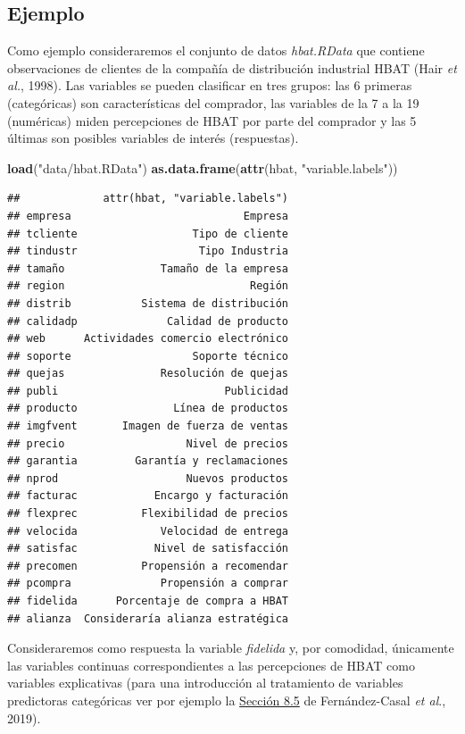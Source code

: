 \documentclass[
]{book}
\newenvironment{Shaded}{\begin{snugshade}}{\end{snugshade}}
\newcommand{\KeywordTok}[1]{\textcolor[rgb]{0.13,0.29,0.53}{\textbf{#1}}}
\newcommand{\NormalTok}[1]{#1}
\newcommand{\StringTok}[1]{\textcolor[rgb]{0.31,0.60,0.02}{#1}}
\theoremstyle{break}
\theoremstyle{definition}
\theoremstyle{definition}
\theoremstyle{definition}
\theoremstyle{remark}
\begin{document}
\hypertarget{ejemplo-1}{%
\subsection{Ejemplo}\label{ejemplo-1}}

Como ejemplo consideraremos el conjunto de datos \emph{hbat.RData} que contiene observaciones de clientes de la compañía de distribución industrial HBAT (Hair \emph{et al.}, 1998).
Las variables se pueden clasificar en tres grupos: las 6 primeras (categóricas) son características del comprador, las variables de la 7 a la 19 (numéricas) miden percepciones de HBAT por parte del comprador y las 5 últimas son posibles variables de interés (respuestas).

\begin{Shaded}
\begin{Highlighting}[]
\KeywordTok{load}\NormalTok{(}\StringTok{"data/hbat.RData"}\NormalTok{)}
\KeywordTok{as.data.frame}\NormalTok{(}\KeywordTok{attr}\NormalTok{(hbat, }\StringTok{"variable.labels"}\NormalTok{))}
\end{Highlighting}
\end{Shaded}

\begin{verbatim}
##             attr(hbat, "variable.labels")
## empresa                           Empresa
## tcliente                  Tipo de cliente
## tindustr                   Tipo Industria
## tamaño               Tamaño de la empresa
## region                             Región
## distrib           Sistema de distribución
## calidadp              Calidad de producto
## web      Actividades comercio electrónico
## soporte                   Soporte técnico
## quejas               Resolución de quejas
## publi                          Publicidad
## producto               Línea de productos
## imgfvent       Imagen de fuerza de ventas
## precio                   Nivel de precios
## garantia         Garantía y reclamaciones
## nprod                    Nuevos productos
## facturac            Encargo y facturación
## flexprec          Flexibilidad de precios
## velocida             Velocidad de entrega
## satisfac            Nivel de satisfacción
## precomen          Propensión a recomendar
## pcompra              Propensión a comprar
## fidelida      Porcentaje de compra a HBAT
## alianza  Consideraría alianza estratégica
\end{verbatim}

Consideraremos como respuesta la variable \emph{fidelida} y, por comodidad, únicamente las variables continuas correspondientes a las percepciones de HBAT como variables explicativas (para una introducción al tratamiento de variables predictoras categóricas ver por ejemplo la \href{https://rubenfcasal.github.io/intror/modelos-lineales.html\#regresion-con-variables-categoricas}{Sección 8.5} de Fernández-Casal \emph{et al}., 2019).
\end{document}
